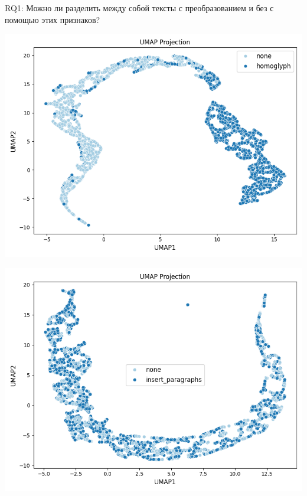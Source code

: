 \documentclass{beamer}
\begin{document}
\begin{frame}{RQ1: Можно ли разделить между собой тексты с преобразованием и без с помощью этих признаков?}
    \begin{minipage}{0.48\textwidth}
        \centering
        \includegraphics[width=\linewidth]{images_sem2/umap_homoglyph.png}
    \end{minipage}\hfill
    \begin{minipage}{0.48\textwidth}
        \centering
        \includegraphics[width=\linewidth]{images_sem2/umap_insert_paragraphs.png}
    \end{minipage}

    \vspace{0.05cm}


\end{frame}
\end{document}

